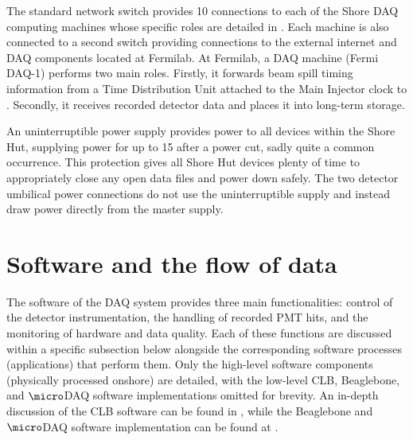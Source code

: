 The standard network switch provides \SI{10}{} connections to each of the Shore DAQ
computing machines whose specific roles are detailed in . Each machine is
also connected to a second switch providing connections to the external internet and DAQ
components located at Fermilab. At Fermilab, a DAQ machine (Fermi DAQ-1) performs two main roles.
Firstly, it forwards \numi beam spill timing information from a Time Distribution Unit attached to
the Main Injector clock to \chipsfive. Secondly, it receives recorded detector data and places it
into long-term storage.

An uninterruptible power supply provides power to all devices within the Shore Hut, supplying
power for up to \SI{15}{} after a power cut, sadly quite a common occurrence. This
protection gives all Shore Hut devices plenty of time to appropriately close any open data files
and power down safely. The two detector umbilical power connections do not use the uninterruptible
supply and instead draw power directly from the master supply.

\section{Software and the flow of data} %
\label{sec:daq_soft} %

The software of the \chipsfive DAQ system provides three main functionalities: control of the
detector instrumentation, the handling of recorded PMT hits, and the monitoring of hardware and
data quality. Each of these functions are discussed within a specific subsection below alongside
the corresponding software processes (applications) that perform them. Only the high-level
software components (physically processed onshore) are detailed, with the low-level CLB,
Beaglebone, and $\micro$DAQ software implementations omitted for brevity. An in-depth discussion
of the CLB software can be found in , while the Beaglebone and
$\micro$DAQ software implementation can be found at .

